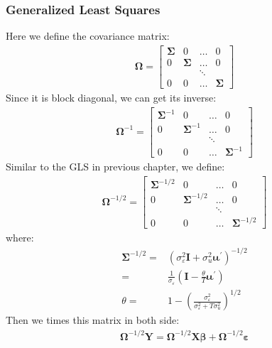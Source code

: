 \documentclass{article}
\begin{document}
\subsubsection{Generalized Least Squares}
Here we define the covariance matrix:
	\begin{align*}
		\boldsymbol{\Omega} = 
		\begin{bmatrix}
			\boldsymbol{\Sigma} & 0 & \ldots & 0\\
			0 & \boldsymbol{\Sigma} & \ldots & 0\\
			& & \ddots &\\
			0 & 0 & \ldots & \boldsymbol{\Sigma}
		\end{bmatrix}
	\end{align*}
Since it is block diagonal, we can get its inverse:
	\begin{align*}
		\boldsymbol{\Omega}^{-1} = 
		\begin{bmatrix}
			\boldsymbol{\Sigma}^{-1} & 0 & \ldots & 0\\
			0 & \boldsymbol{\Sigma}^{-1} & \ldots & 0\\
			& & \ddots &\\
			0 & 0 & \ldots & \boldsymbol{\Sigma}^{-1}
		\end{bmatrix}
	\end{align*}
Similar to the GLS in previous chapter, we define:
	\begin{align*}
		\boldsymbol{\Omega}^{-1/2} = 
		\begin{bmatrix}
			\boldsymbol{\Sigma}^{-1/2} & 0 & \ldots & 0\\
			0 & \boldsymbol{\Sigma}^{-1/2} & \ldots & 0\\
			& & \ddots &\\
			0 & 0 & \ldots & \boldsymbol{\Sigma}^{-1/2}
		\end{bmatrix}
	\end{align*}
where:
	\begin{align*}
		\boldsymbol{\Sigma}^{-1/2} = & (\sigma^2_\varepsilon \boldsymbol{I} + \sigma^2_u \boldsymbol{\iota} \boldsymbol{\iota}^\prime)^{-1/2}\\ = &
		\frac{1}{\sigma_\varepsilon} (\boldsymbol{I} - \frac{\theta}{T}\boldsymbol{\iota} \boldsymbol{\iota}^\prime)\\
		\theta = &1 - (\frac{\sigma^2_\varepsilon}{\sigma^2_\varepsilon + T \sigma^2_u})^{1/2}
	\end{align*}
Then we times this matrix in both side:
	\begin{align*}
		\boldsymbol{\Omega}^{-1/2} \boldsymbol{Y} = \boldsymbol{\Omega}^{-1/2} \boldsymbol{X} \boldsymbol{\beta} + \boldsymbol{\Omega}^{-1/2} \boldsymbol{\varepsilon}
	\end{align*}
\end{document}
